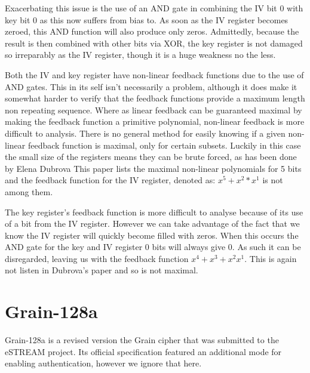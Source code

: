 \documentclass{report}
\let\Oldsection\section
\renewcommand{\section}{\FloatBarrier\Oldsection}
\begin{document}
Exacerbating this issue is the use of an AND gate in combining the IV bit 0 with key bit 0 as this now suffers from bias to. As soon as the IV register becomes zeroed, this AND function will also produce only zeros. Admittedly, because the result is then combined with other bits via XOR, the key register is not damaged so irreparably as the IV register, though it is a huge weakness no the less.

Both the IV and key register have non-linear feedback functions due to the use of AND gates. This in its self isn't necessarily a problem, although it does make it somewhat harder to verify that the feedback functions provide a maximum length non repeating sequence. Where as linear feedback can be guaranteed maximal by making the feedback function a primitive polynomial, non-linear feedback is more difficult to analysis. There is no general method for easily knowing if a given non-linear feedback function is maximal, only for certain subsets. %
Luckily in this case the small size of the registers means they can be brute forced, as has been done by Elena Dubrova%
This paper lists the maximal non-linear polynomials for 5 bits and the feedback function for the IV register, denoted as: $x^5+x^2*x^1$ is not among them. 

The key register's feedback function is more difficult to analyse because of its use of a bit from the IV register. However we can take advantage of the fact that we know the IV register will quickly become filled with zeros. When this occurs the  AND gate for the key and IV register 0 bits will always give 0. As such it can be disregarded, leaving us with the feedback function $x^4+x^3+x^2x^1$. This is again not listen in Dubrova's paper and so is not maximal.%

\begin{figure}[!htb]
\end{figure}

\section{Grain-128a}
Grain-128a\cite{Grain128aSpec} is a revised version the Grain cipher that was submitted to the eSTREAM project. Its official specification featured an additional mode for enabling authentication, however we ignore that here.
\end{document}

